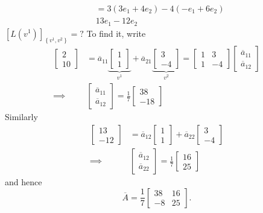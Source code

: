 \begin{enumerate}
\begin{align*}
 & =3\left(3e_{1}+4e_{2}\right)-4\left(-e_{1}+6e_{2}\right)\\
 & 13e_{1}-12e_{2}
\end{align*}
$\left[L\left(v^{1}\right)\right]_{\left\{ v^{1},v^{2}\right\} }=?$
To find it, write
\begin{align*}
\begin{bmatrix}2\\
10
\end{bmatrix} & =\overline{a}_{11}\underbrace{\begin{bmatrix}1\\
1
\end{bmatrix}}_{v^{1}}+\overline{a}_{21}\underbrace{\begin{bmatrix}3\\
-4
\end{bmatrix}}_{v^{2}}=\begin{bmatrix}1 & 3\\
1 & -4
\end{bmatrix}\begin{bmatrix}\overline{a}_{11}\\
\overline{a}_{12}
\end{bmatrix}\\
\implies & \begin{bmatrix}\overline{a}_{11}\\
\overline{a}_{12}
\end{bmatrix}=\frac{1}{7}\begin{bmatrix}38\\
-18
\end{bmatrix}
\end{align*}
Similarly
\begin{align*}
\begin{bmatrix}13\\
-12
\end{bmatrix} & =\overline{a}_{12}\begin{bmatrix}1\\
1
\end{bmatrix}+\overline{a}_{22}\begin{bmatrix}3\\
-4
\end{bmatrix}\\
\implies & \begin{bmatrix}\overline{a}_{12}\\
\overline{a}_{22}
\end{bmatrix}=\frac{1}{7}\begin{bmatrix}16\\
25
\end{bmatrix}
\end{align*}
and hence
$$ \overline{A}  =\frac{1}{7}\begin{bmatrix}38 & 16\\
-8 & 25
\end{bmatrix}. $$
\end{enumerate}

